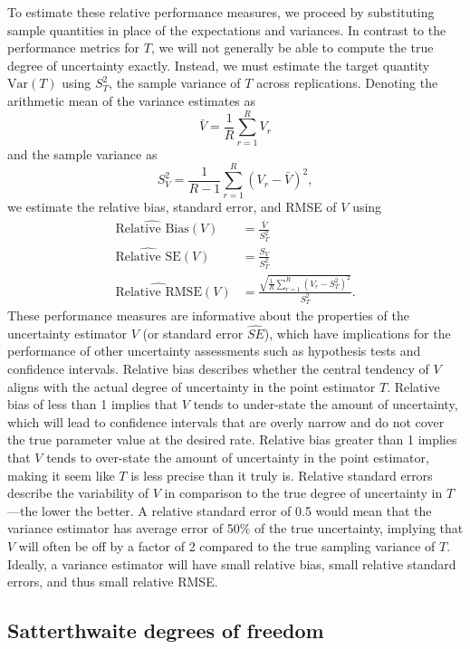 \documentclass[
]{book}
\newcommand{\Var}{\text{Var}}
\begin{document}
To estimate these relative performance measures, we proceed by substituting sample quantities in place of the expectations and variances.
In contrast to the performance metrics for \(T\), we will not generally be able to compute the true degree of uncertainty exactly.
Instead, we must estimate the target quantity \(\Var(T)\) using \(S_T^2\), the sample variance of \(T\) across replications.
Denoting the arithmetic mean of the variance estimates as
\[
\bar{V} = \frac{1}{R} \sum_{r=1}^R V_r
\]
and the sample variance as
\[
S_V^2 = \frac{1}{R - 1}\sum_{r=1}^R \left(V_r - \bar{V}\right)^2,
\]
we estimate the relative bias, standard error, and RMSE of \(V\) using
\[
\begin{aligned}
\widehat{\text{Relative Bias}}(V) &= \frac{\bar{V}}{S_T^2} \\
\widehat{\text{Relative SE}}(V) &= \frac{S_V}{S_T^2} \\
\widehat{\text{Relative RMSE}}(V) &= \frac{\sqrt{\frac{1}{R}\sum_{r=1}^R\left(V_r - S_T^2\right)^2}}{S_T^2}.
\end{aligned}
\label{eq:relative-bias-SE-RMSE-estimators}
\]
These performance measures are informative about the properties of the uncertainty estimator \(V\) (or standard error \(\widehat{SE}\)), which have implications for the performance of other uncertainty assessments such as hypothesis tests and confidence intervals.
Relative bias describes whether the central tendency of \(V\) aligns with the actual degree of uncertainty in the point estimator \(T\).
Relative bias of less than 1 implies that \(V\) tends to under-state the amount of uncertainty, which will lead to confidence intervals that are overly narrow and do not cover the true parameter value at the desired rate.
Relative bias greater than 1 implies that \(V\) tends to over-state the amount of uncertainty in the point estimator, making it seem like \(T\) is less precise than it truly is.
Relative standard errors describe the variability of \(V\) in comparison to the true degree of uncertainty in \(T\)---the lower the better.
A relative standard error of 0.5 would mean that the variance estimator has average error of 50\% of the true uncertainty, implying that \(V\) will often be off by a factor of 2 compared to the true sampling variance of \(T\).
Ideally, a variance estimator will have small relative bias, small relative standard errors, and thus small relative RMSE.

\subsection{Satterthwaite degrees of freedom}\label{satterthwaite-degrees-of-freedom}
\end{document}
